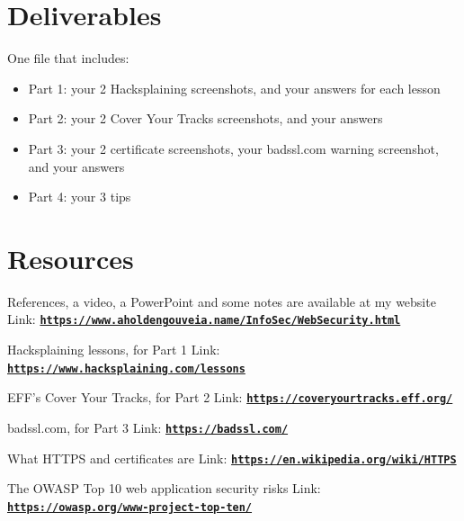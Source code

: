 \documentclass[12pt]{article}
\begin{document}
\section*{Deliverables}
One file that includes:
\begin{itemize}
    \item Part 1: your 2 Hacksplaining screenshots, and your answers for each lesson
    \item Part 2: your 2 Cover Your Tracks screenshots, and your answers
    \item Part 3: your 2 certificate screenshots, your badssl.com warning screenshot, and your answers
    \item Part 4: your 3 tips
\end{itemize}

\section*{Resources}
References, a video, a PowerPoint and some notes are available at my website
Link: \href{https://www.aholdengouveia.name/InfoSec/WebSecurity.html}{\textbf{\nolinkurl{https://www.aholdengouveia.name/InfoSec/WebSecurity.html}}}

Hacksplaining lessons, for Part 1
Link: \href{https://www.hacksplaining.com/lessons}{\textbf{\nolinkurl{https://www.hacksplaining.com/lessons}}}

EFF's Cover Your Tracks, for Part 2
Link: \href{https://coveryourtracks.eff.org/}{\textbf{\nolinkurl{https://coveryourtracks.eff.org/}}}

badssl.com, for Part 3
Link: \href{https://badssl.com/}{\textbf{\nolinkurl{https://badssl.com/}}}

What HTTPS and certificates are
Link: \href{https://en.wikipedia.org/wiki/HTTPS}{\textbf{\nolinkurl{https://en.wikipedia.org/wiki/HTTPS}}}

The OWASP Top 10 web application security risks
Link: \href{https://owasp.org/www-project-top-ten/}{\textbf{\nolinkurl{https://owasp.org/www-project-top-ten/}}}
\end{document}
